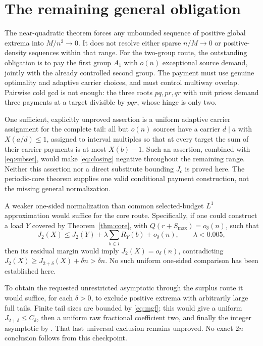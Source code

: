 \documentclass[11pt,a4paper]{article}
\begin{document}
\section{The remaining general obligation}

The near-quadratic theorem forces any unbounded sequence of positive
global extrema into $M/n^2\to0$. It does not resolve either sparse
$n/M\to0$ or positive-density sequences within that range.
For the two-group route, the outstanding obligation is to pay the
first group $A_1$ with $o(n)$ exceptional source demand, jointly with
the already controlled second group. The payment must use genuine
optimality and adaptive carrier choices, and must control multiway
overlap. Pairwise cold gcd is not enough: the three roots $pq,pr,qr$
with unit prices demand three payments at a target divisible by $pqr$,
whose hinge is only two.

One sufficient, explicitly unproved assertion is a uniform adaptive
carrier assignment for the complete tail: all but $o(n)$ sources have
a carrier $d\mid a$ with $X(a/d)\le1$, assigned to interval multiples
so that at every target the sum of their carrier payments is at most
$X(b)-1$. Such an assertion, combined with \eqref{eq:subset}, would
make \eqref{eq:closing} negative throughout the remaining range.
Neither this assertion nor a direct substitute bounding $J_c$ is
proved here. The periodic-core theorem supplies one valid conditional
payment construction, not the missing general normalization.

A weaker one-sided normalization than common selected-budget $L^1$
approximation would suffice for the core route. Specifically, if one
could construct a load $Y$ covered by Theorem~\ref{thm:core}, with
$Q(r+S_{\max})=o_\delta(n)$, such that
\[
 J_2(X)\le J_2(Y)+\lambda\sum_{b\in I}R_Y(b)+o_\delta(n),
 \qquad \lambda<0.005,
\]
then its residual margin would imply $J_2(X)=o_\delta(n)$, contradicting
$J_2(X)\ge J_{2+\delta}(X)+\delta n>\delta n$.
No such uniform one-sided comparison has been established here.

To obtain the requested unrestricted asymptotic through the surplus
route it would suffice, for each $\delta>0$, to exclude positive
extrema with arbitrarily large full tails. Finite tail sizes are bounded
by \eqref{eq:mgf}; this would give a uniform $J_{2+\delta}\le C_\delta$,
then a uniform raw fractional coefficient two, and finally the integer
asymptotic by \cite{WangRaw}. That last universal exclusion remains
unproved. No exact $2n$ conclusion follows from this checkpoint.
\end{document}

